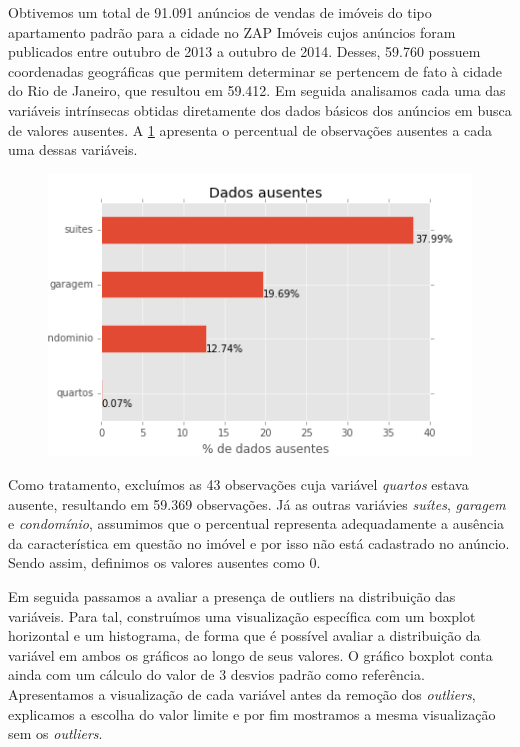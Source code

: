 Obtivemos um total de 91.091 anúncios de vendas de imóveis do tipo apartamento padrão para a cidade no ZAP Imóveis cujos anúncios foram publicados entre outubro de 2013 a outubro de 2014. Desses, 59.760 possuem coordenadas geográficas que permitem determinar se pertencem de fato à cidade do Rio de Janeiro, que resultou em 59.412. Em seguida analisamos cada uma das variáveis intrínsecas obtidas diretamente dos dados básicos dos anúncios em busca de valores ausentes. A \cref{fig:var_intrins_ausente} apresenta o percentual de observações ausentes a cada uma dessas variáveis.


\begin{figure}[th!]
\centering
\includegraphics[width=0.8\linewidth]{img/var_intrins_ausente}
\caption[Percentual de valores ausentes]{}
\caption{}
\label{fig:var_intrins_ausente}
\end{figure}

Como tratamento, excluímos as 43 observações cuja variável \textit{quartos} estava ausente, resultando em 59.369 observações. Já as outras variávies    \textit{suítes}, \textit{garagem} e \textit{condomínio}, assumimos que o percentual representa adequadamente a ausência da característica em questão no imóvel e por isso não está cadastrado no anúncio. Sendo assim, definimos os valores ausentes como 0.

Em seguida passamos a avaliar a presença de outliers na distribuição das variáveis. Para tal, construímos uma visualização específica com um boxplot horizontal e um histograma, de forma que é possível avaliar a distribuição da variável em ambos os gráficos ao longo de seus valores. O gráfico boxplot conta ainda com um cálculo do valor de 3 desvios padrão como referência. Apresentamos a visualização de cada variável antes da remoção dos \textit{outliers}, explicamos a escolha do valor limite e por fim mostramos a mesma visualização sem os \textit{outliers}.

